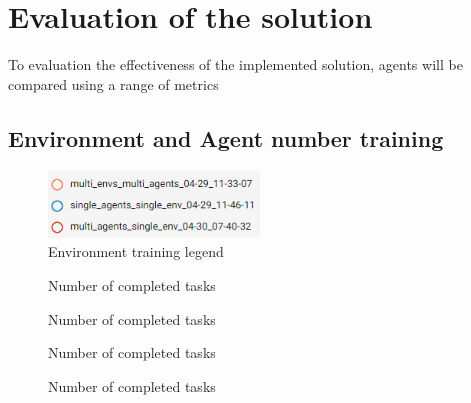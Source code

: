 \chapter{Evaluation of the solution}\label{ch:evaluation-of-the-solution}
To evaluation the effectiveness of the implemented solution, agents will be compared using a
range of metrics


\section{Environment and Agent number training}\label{sec:environment-training}

\begin{figure}
    \includegraphics[width=0.5\textwidth]{figures/env_training_fig/env_training_legend.png}
    \caption{Environment training legend}
    \label{fig:env-training-legend}
\end{figure}

\begin{figure}[h]
    \centering
    
    \caption{Number of completed tasks}
    \label{fig:env_num_completed_tasks}
\end{figure}

\begin{figure}[h]
    \centering
    
    \caption{Number of completed tasks}
    \label{fig:env_num_failed_tasks}
\end{figure}

\begin{figure}[h]
    \centering
    
    \caption{Number of completed tasks}
    \label{fig:env_percent_tasks}
\end{figure}

\begin{figure}[h]
    \centering
    
    \caption{Number of completed tasks}
    \label{fig:env_total_prices}
\end{figure}

